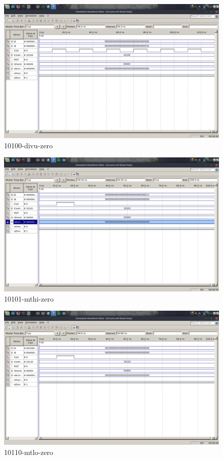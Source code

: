 \documentclass[12pt]{article}
\begin{document}
\begin{figure}[H]
	\centering
	\includegraphics[width=.8\textwidth]{10100-divu-zero.png}
	\caption{10100-divu-zero}
	\label{fig:10100-divu-zero}
\end{figure}

\begin{figure}[H]
	\centering
	\includegraphics[width=.8\textwidth]{10101-mthi-zero.png}
	\caption{10101-mthi-zero}
	\label{fig:10101-mthi-zero}
\end{figure}

\begin{figure}[H]
	\centering
	\includegraphics[width=.8\textwidth]{10110-mtlo-zero.png}
	\caption{10110-mtlo-zero}
	\label{fig:10110-mtlo-zero}
\end{figure}
\end{document}
